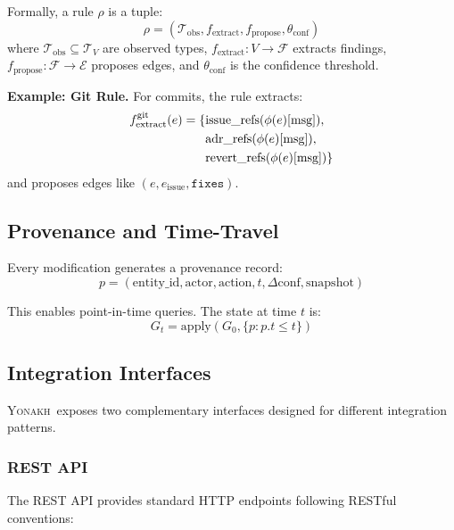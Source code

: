 \documentclass[10pt,journal,compsoc]{IEEEtran}
\newcommand{\yonakh}{\textsc{Yonakh}}
\begin{document}
Formally, a rule $\rho$ is a tuple:
\begin{equation}
\rho = (\mathcal{T}_{\text{obs}}, f_{\text{extract}}, f_{\text{propose}}, \theta_{\text{conf}})
\end{equation}
where $\mathcal{T}_{\text{obs}} \subseteq \mathcal{T}_V$ are observed types, $f_{\text{extract}}: V \to \mathcal{F}$ extracts findings, $f_{\text{propose}}: \mathcal{F} \to \mathcal{E}$ proposes edges, and $\theta_{\text{conf}}$ is the confidence threshold.

\textbf{Example: Git Rule.} For commits, the rule extracts:
\begin{align}
f_{\text{extract}}^{\text{git}}(e) = \{&\text{issue\_refs}(\phi(e)[\text{msg}]), \notag \\
&\text{adr\_refs}(\phi(e)[\text{msg}]), \\
&\text{revert\_refs}(\phi(e)[\text{msg}])\} \notag
\end{align}
and proposes edges like $(e, e_{\text{issue}}, \texttt{fixes})$.

\subsection{Provenance and Time-Travel}

Every modification generates a provenance record:
\begin{equation}
p = (\text{entity\_id}, \text{actor}, \text{action}, t, \Delta\text{conf}, \text{snapshot})
\end{equation}

This enables point-in-time queries. The state at time $t$ is:
\begin{equation}
G_t = \text{apply}(G_0, \{p : p.t \leq t\})
\end{equation}

\subsection{Integration Interfaces}

\yonakh\ exposes two complementary interfaces designed for different integration patterns.

\subsubsection{REST API}

The REST API provides standard HTTP endpoints following RESTful conventions:
\end{document}
